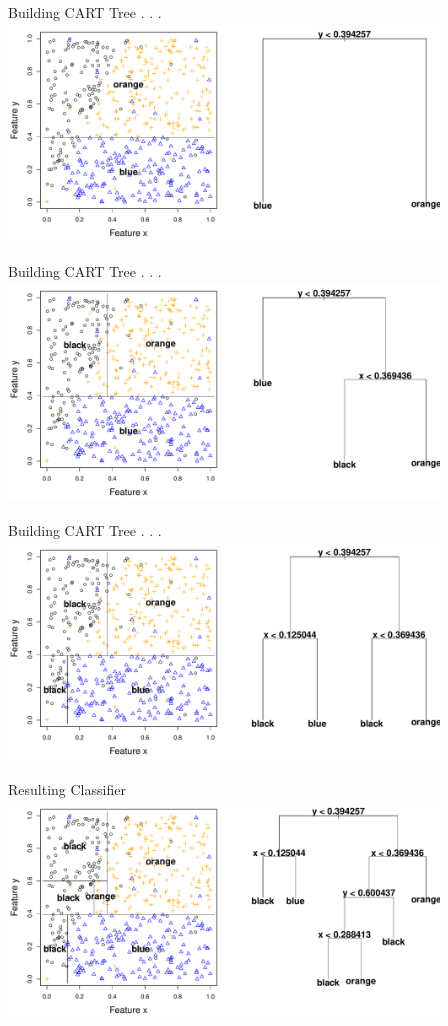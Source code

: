 \documentclass[12pt]{beamer}
\begin{document}
\begin{frame}{Building CART Tree . . .}
\includegraphics[height=2.3in,width=4.5in]{figs/tree_2.pdf}
\end{frame}

\begin{frame}{Building CART Tree . . .}
\includegraphics[height=2.3in,width=4.5in]{figs/tree_3.pdf}
\end{frame}

\begin{frame}{Building CART Tree . . .}
\includegraphics[height=2.3in,width=4.5in]{figs/tree_4.pdf}
\end{frame}

\begin{frame}{Resulting Classifier}
\includegraphics[height=2.3in,width=4.5in]{figs/tree_5.pdf}
\end{frame}
\end{document}
